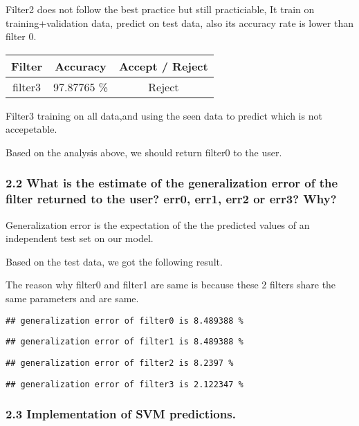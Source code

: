 \documentclass[
]{article}
\begin{document}
Filter2 does not follow the best practice but still practiciable, It
train on training+validation data, predict on test data, also its
accuracy rate is lower than filter 0.

\begin{longtable}[]{@{}ccc@{}}
\toprule\noalign{}
Filter & Accuracy & Accept / Reject \\
\midrule\noalign{}
\endhead
\bottomrule\noalign{}
\endlastfoot
filter3 & 97.87765 \% & Reject \\
\end{longtable}

Filter3 training on all data,and using the seen data to predict which is
not accepetable.

Based on the analysis above, we should return filter0 to the user.

\subsubsection{2.2 What is the estimate of the generalization error of
the filter returned to the user? err0, err1, err2 or err3?
Why?}\label{what-is-the-estimate-of-the-generalization-error-of-the-filter-returned-to-the-user-err0-err1-err2-or-err3-why}

Generalization error is the expectation of the the predicted values of
an independent test set on our model.

Based on the test data, we got the following result.

The reason why filter0 and filter1 are same is because these 2 filters
share the same parameters and are same.

\begin{verbatim}
## generalization error of filter0 is 8.489388 %
\end{verbatim}

\begin{verbatim}
## generalization error of filter1 is 8.489388 %
\end{verbatim}

\begin{verbatim}
## generalization error of filter2 is 8.2397 %
\end{verbatim}

\begin{verbatim}
## generalization error of filter3 is 2.122347 %
\end{verbatim}

\subsubsection{2.3 Implementation of SVM
predictions.}\label{implementation-of-svm-predictions.}
\end{document}
